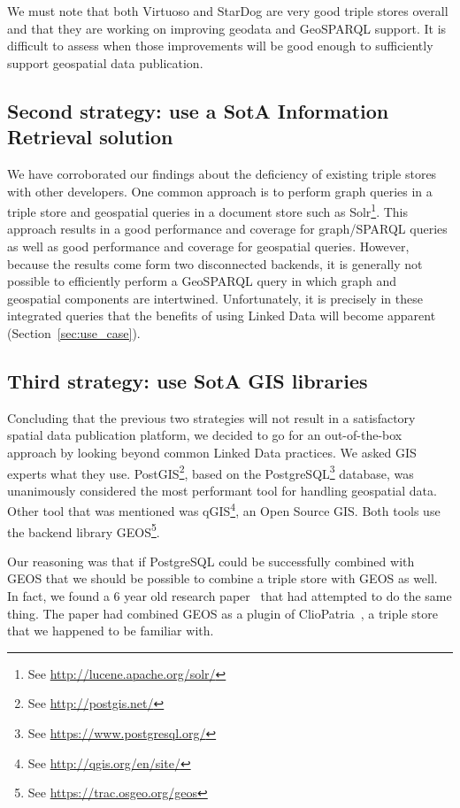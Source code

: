 \documentclass[a4paper]{scrartcl}
\newcommand{\seeUrl}[1]{\footnote{See \mbox{\url{#1}}}}
\begin{document}
We must note that both Virtuoso and StarDog are very good triple
stores overall and that they are working on improving geodata and
GeoSPARQL support.  It is difficult to assess when those improvements
will be good enough to sufficiently support geospatial data
publication.


\subsection{Second strategy: use a SotA Information Retrieval solution}

We have corroborated our findings about the deficiency of existing
triple stores with other developers.  One common approach is to
perform graph queries in a triple store and geospatial queries in a
document store such as Solr\seeUrl{http://lucene.apache.org/solr/}.
This approach results in a good performance and coverage for
graph/SPARQL queries as well as good performance and coverage for
geospatial queries.  However, because the results come form two
disconnected backends, it is generally not possible to efficiently
perform a GeoSPARQL query in which graph and geospatial components are
intertwined.  Unfortunately, it is precisely in these integrated
queries that the benefits of using Linked Data will become apparent
(Section~\ref{sec:use_case}).


\subsection{Third strategy: use SotA GIS libraries}

Concluding that the previous two strategies will not result in a
satisfactory spatial data publication platform, we decided to go for
an out-of-the-box approach by looking beyond common Linked Data
practices.  We asked GIS experts what they use.
PostGIS\seeUrl{http://postgis.net/}, based on the
PostgreSQL\seeUrl{https://www.postgresql.org/} database, was
unanimously considered the most performant tool for handling
geospatial data.  Other tool that was mentioned was
qGIS\seeUrl{http://qgis.org/en/site/}, an Open Source GIS.  Both tools
use the backend library GEOS\seeUrl{https://trac.osgeo.org/geos}.

Our reasoning was that if PostgreSQL could be successfully combined
with GEOS that we should be possible to combine a triple store with
GEOS as well.  In fact, we found a 6 year old research
paper~\cite{VanHage2010} that had attempted to do the same thing.  The
paper had combined GEOS as a plugin of
ClioPatria~\cite{Wielemaker2015}, a triple store that we happened to be
familiar with.
\end{document}
